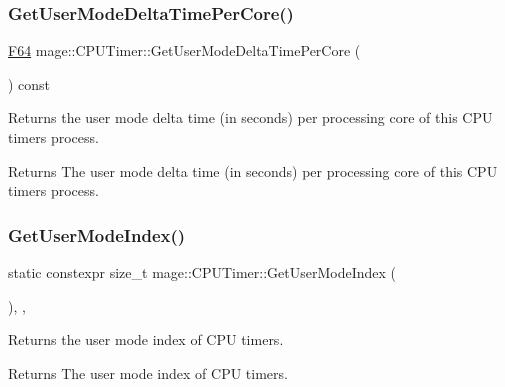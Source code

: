 \subsubsection{\texorpdfstring{Get\+User\+Mode\+Delta\+Time\+Per\+Core()}{GetUserModeDeltaTimePerCore()}}
{\footnotesize\ttfamily \hyperlink{namespacemage_ad26233bbec640deda836e572c1a23708}{F64} mage\+::\+C\+P\+U\+Timer\+::\+Get\+User\+Mode\+Delta\+Time\+Per\+Core (\begin{DoxyParamCaption}{ }\end{DoxyParamCaption}) const\hspace{0.3cm}{\ttfamily [noexcept]}}

Returns the user mode delta time (in seconds) per processing core of this C\+PU timer\textquotesingle{}s process.

\begin{DoxyReturn}{Returns}
The user mode delta time (in seconds) per processing core of this C\+PU timer\textquotesingle{}s process. 
\end{DoxyReturn}
\hypertarget{classmage_1_1_c_p_u_timer_a457d65db3cb67775971e2750755ad403}{}\label{classmage_1_1_c_p_u_timer_a457d65db3cb67775971e2750755ad403} 
\subsubsection{\texorpdfstring{Get\+User\+Mode\+Index()}{GetUserModeIndex()}}
{\footnotesize\ttfamily static constexpr size\+\_\+t mage\+::\+C\+P\+U\+Timer\+::\+Get\+User\+Mode\+Index (\begin{DoxyParamCaption}{ }\end{DoxyParamCaption})\hspace{0.3cm}{\ttfamily [static]}, {\ttfamily [private]}, {\ttfamily [noexcept]}}

Returns the user mode index of C\+PU timers.

\begin{DoxyReturn}{Returns}
The user mode index of C\+PU timers. 
\end{DoxyReturn}
\hypertarget{classmage_1_1_c_p_u_timer_a22c40a268b8638b6f78c678fc392e4b2}{}\label{classmage_1_1_c_p_u_timer_a22c40a268b8638b6f78c678fc392e4b2} 
